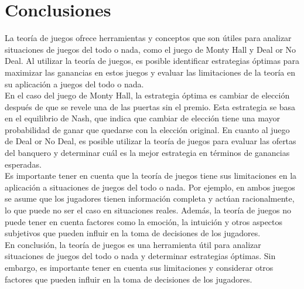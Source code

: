 \section{Conclusiones}

La teoría de juegos ofrece herramientas y conceptos que son útiles para analizar situaciones de 
juegos del todo o nada, como el juego de Monty Hall y Deal or No Deal. 
Al utilizar la teoría de juegos, es posible identificar estrategias óptimas para maximizar 
las ganancias en estos juegos y evaluar las limitaciones de la teoría en su aplicación a juegos 
del todo o nada.\\

En el caso del juego de Monty Hall, la estrategia óptima es cambiar de elección después de que se
revele una de las puertas sin el premio. Esta estrategia se basa en el equilibrio de Nash, 
que indica que cambiar de elección tiene una mayor probabilidad de ganar que quedarse con la elección
original. En cuanto al juego de Deal or No Deal, es posible utilizar la teoría de juegos para 
evaluar las ofertas del banquero y determinar cuál es la mejor estrategia en términos de ganancias 
esperadas.\\

Es importante tener en cuenta que la teoría de juegos tiene sus limitaciones en la aplicación 
a situaciones de juegos del todo o nada. Por ejemplo, en ambos juegos se asume que los 
jugadores tienen información completa y actúan racionalmente, lo que puede no ser el caso en 
situaciones reales. Además, la teoría de juegos no puede tener en cuenta factores como la emoción, 
la intuición y otros aspectos subjetivos que pueden influir en la toma de decisiones de los jugadores.\\

En conclusión, la teoría de juegos es una herramienta útil para analizar situaciones de 
juegos del todo o nada y determinar estrategias óptimas. Sin embargo, es importante tener en 
cuenta sus limitaciones y considerar otros factores que pueden influir en la toma de decisiones 
de los jugadores.\\
